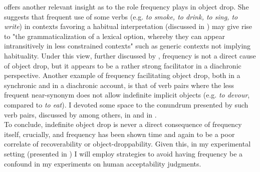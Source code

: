 \textcite{Goldberg2005a} offers another relevant insight as to the role frequency plays in object drop. She suggests that frequent use of some verbs (e.g. \textit{to smoke, to drink, to sing, to write}) in contexts favoring a habitual interpretation (discussed in ) may give rise to "the grammaticalization of a lexical option, whereby they can appear intransitively in less constrained contexts" such as generic contexts not implying habituality. Under this view, further discussed by \textcite[65]{Lorenzetti2008}, frequency is not a direct cause of object drop, but it appears to be a rather strong facilitator in a diachronic perspective. Another example of frequency facilitating object drop, both in a synchronic and in a diachronic account, is that of verb pairs where the less frequent near-synonym does not allow indefinite implicit objects (e.g. \textit{to devour}, compared to \textit{to eat}). I devoted some space to the conundrum presented by such verb pairs, discussed by \textcite{Glass2020, Goldberg2005a, Lorenzetti2008} among others, in  and in .\\
To conclude, indefinite object drop is never a direct consequence of frequency itself, crucially, and frequency has been shown time and again to be a poor correlate of recoverability or object-droppability. Given this, in my experimental setting (presented in ) I will employ strategies to avoid having frequency be a confound in my experiments on human acceptability judgments.

